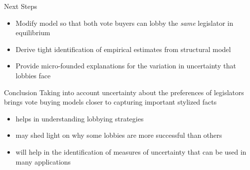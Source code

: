\documentclass[handout]{beamer}
\begin{document}
\begin{frame}{Next Steps}
\pause
\begin{itemize}[<+->]
	\item Modify model so that both vote buyers can lobby the \textit{same} legislator in equilibrium
	\item Derive tight identification of empirical estimates from structural model
	\item Provide micro-founded explanations for the variation in uncertainty that lobbies face
\end{itemize}

\end{frame}


\begin{frame}{Conclusion}
Taking into account uncertainty about the preferences of legislators brings vote buying models closer to capturing important stylized facts
\pause
\begin{itemize}[<+->]
		\item helps in understanding lobbying strategies
		\item may shed light on why some lobbies are more successful than others
		\item will help in the identification of measures of uncertainty that can be used in many applications
\end{itemize}

\end{frame}
\end{document}
